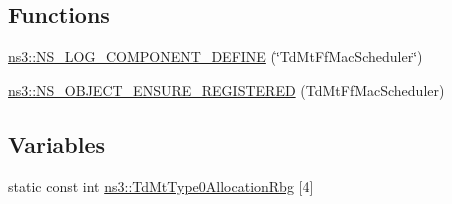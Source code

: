 \subsection*{Functions}
\begin{DoxyCompactItemize}
\item 
\hyperlink{namespacens3_aca96585fc83244c3fed435b3964568b0}{ns3\+::\+N\+S\+\_\+\+L\+O\+G\+\_\+\+C\+O\+M\+P\+O\+N\+E\+N\+T\+\_\+\+D\+E\+F\+I\+NE} (\char`\"{}Td\+Mt\+Ff\+Mac\+Scheduler\char`\"{})
\item 
\hyperlink{namespacens3_adb6a3b479d18ae8f5f8b4da09ca9b7e2}{ns3\+::\+N\+S\+\_\+\+O\+B\+J\+E\+C\+T\+\_\+\+E\+N\+S\+U\+R\+E\+\_\+\+R\+E\+G\+I\+S\+T\+E\+R\+ED} (Td\+Mt\+Ff\+Mac\+Scheduler)
\end{DoxyCompactItemize}
\subsection*{Variables}
\begin{DoxyCompactItemize}
\item 
static const int \hyperlink{namespacens3_a9d126871960cef5cae1fa6d78c8260d0}{ns3\+::\+Td\+Mt\+Type0\+Allocation\+Rbg} \mbox{[}4\mbox{]}
\end{DoxyCompactItemize}
